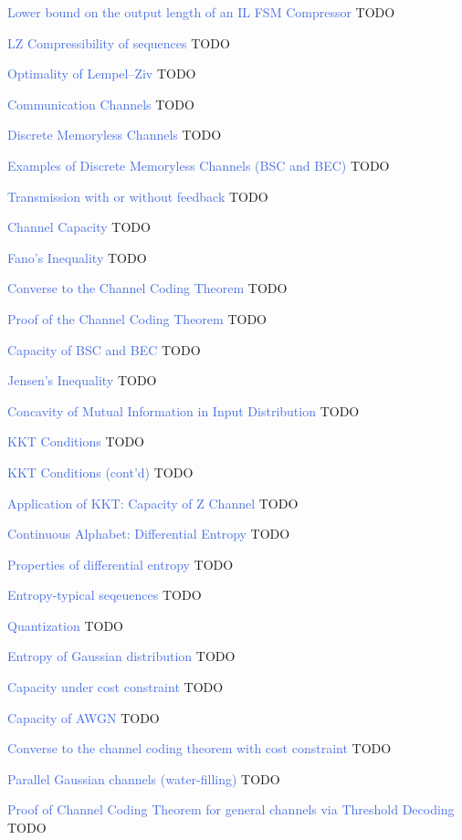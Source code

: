 \documentclass[10pt,a4paper,landscape]{article}
\newcommand{\concept}[1]{\textcolor{RoyalBlue}{#1}}
\renewcommand{\section}[1]{
    \vspace{-0.3cm}
    \begin{center}
      \color{Bittersweet}
      \hrulefill{\small~~#1~~}\hrulefill
    \end{center}
    \vspace{-0.3cm}
  }
\begin{document}
\begin{multicols*}{4}
\concept{Lower bound on the output length of an IL FSM Compressor} TODO

\concept{LZ Compressibility of sequences} TODO

\concept{Optimality of Lempel–Ziv} TODO

\section{Channels}

\concept{Communication Channels} TODO

\concept{Discrete Memoryless Channels} TODO

\concept{Examples of Discrete Memoryless Channels (BSC and BEC)} TODO

\concept{Transmission with or without feedback} TODO

\concept{Channel Capacity} TODO

\concept{Fano's Inequality} TODO

\concept{Converse to the Channel Coding Theorem	} TODO
			
\concept{Proof of the Channel Coding Theorem} TODO

\concept{Capacity of BSC and BEC } TODO

\concept{Jensen's Inequality } TODO

\concept{Concavity of Mutual Information in Input Distribution} TODO
 
\concept{KKT Conditions} TODO

\concept{KKT Conditions (cont'd)} TODO
 
\concept{Application of KKT: Capacity of Z Channel} TODO
 
\concept{Continuous Alphabet: Differential Entropy} TODO

\concept{Properties of differential entropy} TODO
 
\concept{Entropy-typical seqeuences} TODO
 
\concept{Quantization} TODO
 
\concept{Entropy of Gaussian distribution} TODO

\concept{Capacity under cost constraint} TODO
 
\concept{Capacity of AWGN} TODO
 
\concept{Converse to the channel coding theorem with cost constraint} TODO
 
\concept{Parallel Gaussian channels (water-filling)} TODO

\concept{Proof of Channel Coding Theorem for general channels via Threshold Decoding} TODO


\end{multicols*}
\end{document}
